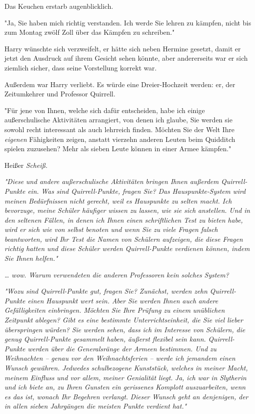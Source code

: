 {Das Keuchen erstarb augenblicklich.

"Ja, Sie haben mich richtig verstanden. Ich werde Sie lehren zu kämpfen, nicht bis zum Montag zwölf Zoll über das Kämpfen zu schreiben."

Harry wünschte sich verzweifelt, er hätte sich neben Hermine gesetzt, damit er jetzt den Ausdruck auf ihrem Gesicht sehen könnte, aber andererseits war er sich ziemlich sicher, dass seine Vorstellung korrekt war.

Außerdem war Harry verliebt. Es würde eine Dreier-Hochzeit werden: er, der Zeitumkehrer und Professor Quirrell.

"Für jene von Ihnen, welche sich dafür entscheiden, habe ich einige außerschulische Aktivitäten arrangiert, von denen ich glaube, Sie werden sie sowohl recht interessant als auch lehrreich finden. Möchten Sie der Welt Ihre \emph{eigenen} Fähigkeiten zeigen, anstatt vierzehn anderen Leuten beim Quidditch spielen zuzusehen? Mehr als sieben Leute können in einer Armee kämpfen."

Heißer \emph{Scheiß.}

\emph{"Diese und andere außerschulische Aktivitäten bringen Ihnen außerdem Quirrell-Punkte ein. Was sind Quirrell-Punkte, fragen Sie? Das Hauspunkte-System wird meinen Bedürfnissen nicht gerecht, weil es Hauspunkte zu selten macht. Ich bevorzuge, meine Schüler häufiger wissen zu lassen, wie sie sich anstellen. Und in den seltenen Fällen, in denen ich Ihnen einen schriftlichen Test zu bieten habe, wird er sich wie von selbst benoten und wenn Sie zu viele Fragen falsch beantworten, wird Ihr Test die Namen von Schülern aufzeigen, die diese Fragen richtig hatten und diese Schüler werden Quirrell-Punkte verdienen können, indem Sie Ihnen helfen."}

\emph{… wow. Warum verwendeten die anderen Professoren kein solches System?}

\emph{"Wozu sind Quirrell-Punkte gut, fragen Sie? Zunächst, werden zehn Quirrell-Punkte einen Hauspunkt wert sein. Aber Sie werden Ihnen auch} \emph{andere Gefälligkeiten einbringen. Möchten Sie Ihre Prüfung zu einem} \emph{unüblichen Zeitpunkt ablegen? Gibt es eine bestimmte Unterrichtseinheit, die Sie viel lieber überspringen würden? Sie werden sehen, dass ich im Interesse von Schülern, die genug Quirrell-Punkte gesammelt haben, äußerst flexibel sein kann. Quirrell-Punkte werden über die Generalsränge der Armeen bestimmen. Und zu Weihnachten -- genau vor den Weihnachtsferien -- werde ich jemandem einen Wunsch gewähren. Jedwedes schulbezogene Kunststück, welches in meiner Macht, meinem Einfluss und vor allem, meiner Genialität liegt.} \emph{Ja, ich war in Slytherin und ich biete an, zu Ihren Gunsten ein gerissenes Komplott auszuarbeiten, wenn es das ist, wonach Ihr Begehren verlangt.} \emph{Dieser Wunsch geht an denjenigen, der in allen sieben Jahrgängen die meisten Punkte verdient hat."}

}
